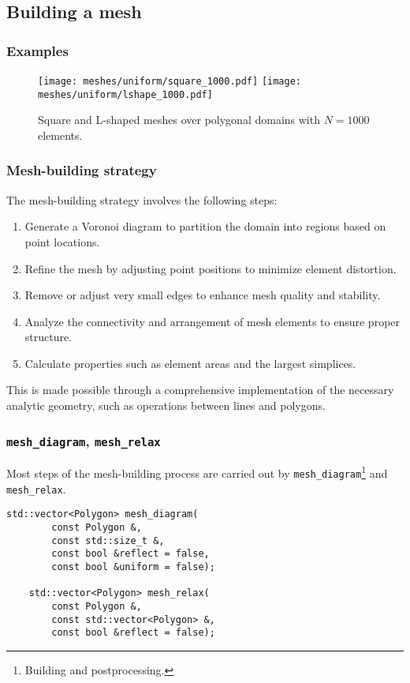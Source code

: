 \subsection{Building a mesh}

\begin{frame}
    \frametitle{Examples}

    \begin{figure}[!ht]
        \centering
        \texttt{[image: meshes/uniform/square\_1000.pdf]}
        \texttt{[image: meshes/uniform/lshape\_1000.pdf]}
        \caption{Square and L-shaped meshes over polygonal domains with $N = 1000$ elements.}
    \end{figure}
\end{frame}

\begin{frame}
    \frametitle{Mesh-building strategy}

    The mesh-building strategy involves the following steps:

    \begin{enumerate}
        \item Generate a Voronoi diagram to partition the domain into regions based on point locations.
        \item Refine the mesh by adjusting point positions to minimize element distortion.
        \item Remove or adjust very small edges to enhance mesh quality and stability.
        \item Analyze the connectivity and arrangement of mesh elements to ensure proper structure.
        \item Calculate properties such as element areas and the largest simplices.
    \end{enumerate}

    This is made possible through a comprehensive implementation of the necessary analytic geometry, such as operations between lines and polygons.

\end{frame}

\begin{frame}[fragile]
    \frametitle{\lstinline{mesh_diagram}, \lstinline{mesh_relax}}

    Most steps of the mesh-building process are carried out by \lstinline{mesh_diagram}\footnote{Building and postprocessing.} and \lstinline{mesh_relax}.

    \begin{lstlisting}[style=cpp]
    std::vector<Polygon> mesh_diagram(
        const Polygon &, 
        const std::size_t &, 
        const bool &reflect = false, 
        const bool &uniform = false);

    std::vector<Polygon> mesh_relax(
        const Polygon &, 
        const std::vector<Polygon> &, 
        const bool &reflect = false);
    \end{lstlisting}

\end{frame}

